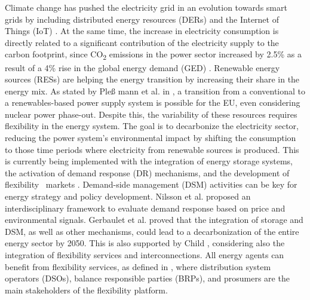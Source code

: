 Climate change has pushed the electricity grid in an evolution towards smart grids by including distributed energy resources (DERs) and the {Internet of Things (IoT)} \cite{EuropeanCommission2012}. At the same time, the increase in electricity consumption is directly related to a significant contribution of the electricity supply to the carbon footprint, since CO\textsubscript 2 emissions in the power sector increased by 2.5\% as a result of a 4\% rise  in the global energy demand (GED) \cite{IEA2018}. Renewable energy sources (RESs) are helping the energy transition by increasing their share in the energy mix. {As stated by Ple{\ss}%
mann et al. in \cite{PLEMANN201719}, a transition from a conventional to a renewables-based power supply system is possible for the EU, even considering nuclear power phase-out.} Despite this, the variability of these resources requires flexibility in the energy system. The goal is to {decarbonize the electricity sector, reducing the power system's environmental impact by shifting the consumption to those time periods where electricity from renewable sources is produced}. This is currently being implemented with the integration of energy storage systems, the activation of demand response (DR) mechanisms, and the development of flexibility%
~markets \cite{USEFFoundation2015a,  LocalMicroPowerMarkets2019CH2}. Demand-side management (DSM) activities can be key for energy strategy and policy development. Nilsson et al. \cite{NILSSON2018273} proposed an interdisciplinary framework to evaluate demand response based on price and environmental signals.  {Gerbaulet et al. \cite{GERBAULET2019973} proved that the integration of storage and DSM, as well as other mechanisms, could lead to a decarbonization of the entire energy sector by 2050. This is also supported by Child \cite{CHILD201980}, considering also the integration of flexibility%
 services and interconnections. All energy agents can benefit from {flexibility}%
 services, as defined in \cite{Olivella2018}, where distribution system operators (DSOs), balance responsible parties (BRPs), and prosumers are the main stakeholders of the flexibility%
 platform.} 

